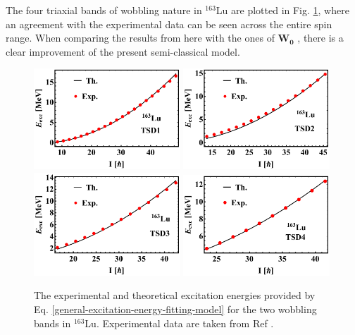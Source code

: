 The four triaxial bands of wobbling nature in $^{163}$Lu are plotted in Fig. \ref{excitation-energies-th-163Lu}, where an agreement with the experimental data can be seen across the entire spin range. When comparing the results from here with the ones of $\mathbf{W_0}$ \cite{raduta2017semiclassical}, there is a clear improvement of the present semi-classical model.
\begin{figure}
    \centering
    \includegraphics[width=0.49\textwidth]{Chapters/Figures/Lu-exp-energies/fig3a_lu163.pdf }
    \includegraphics[width=0.49\textwidth]{Chapters/Figures/Lu-exp-energies/fig3b_lu163.pdf }
    \includegraphics[width=0.49\textwidth]{Chapters/Figures/Lu-exp-energies/fig3c_lu163.pdf }
    \includegraphics[width=0.49\textwidth]{Chapters/Figures/Lu-exp-energies/fig3d_lu163.pdf }
    \caption{The experimental and theoretical excitation energies provided by Eq. \ref{general-excitation-energy-fitting-model} for the two wobbling bands in $^{163}$Lu. Experimental data are taken from Ref \cite{reich2010nuclear}.}
    \label{excitation-energies-th-163Lu}
\end{figure}

